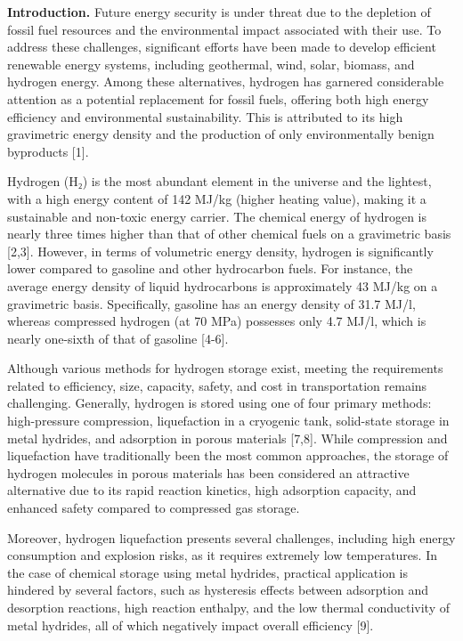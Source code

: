 \begin{multicols}{2}
{\bfseries Introduction.} Future energy security is under threat due to the
depletion of fossil fuel resources and the environmental impact
associated with their use. To address these challenges, significant
efforts have been made to develop efficient renewable energy systems,
including geothermal, wind, solar, biomass, and hydrogen energy. Among
these alternatives, hydrogen has garnered considerable attention as a
potential replacement for fossil fuels, offering both high energy
efficiency and environmental sustainability. This is attributed to its
high gravimetric energy density and the production of only
environmentally benign byproducts {[}1{]}.

Hydrogen (H₂) is the most abundant element in the universe and the
lightest, with a high energy content of 142 MJ/kg (higher heating
value), making it a sustainable and non-toxic energy carrier. The
chemical energy of hydrogen is nearly three times higher than that of
other chemical fuels on a gravimetric basis {[}2,3{]}. However, in terms
of volumetric energy density, hydrogen is significantly lower compared
to gasoline and other hydrocarbon fuels. For instance, the average
energy density of liquid hydrocarbons is approximately 43 MJ/kg on a
gravimetric basis. Specifically, gasoline has an energy density of 31.7
MJ/l, whereas compressed hydrogen (at 70 MPa) possesses only 4.7 MJ/l,
which is nearly one-sixth of that of gasoline {[}4-6{]}.

Although various methods for hydrogen storage exist, meeting the
requirements related to efficiency, size, capacity, safety, and cost in
transportation remains challenging. Generally, hydrogen is stored using
one of four primary methods: high-pressure compression, liquefaction in
a cryogenic tank, solid-state storage in metal hydrides, and adsorption
in porous materials {[}7,8{]}. While compression and liquefaction have
traditionally been the most common approaches, the storage of hydrogen
molecules in porous materials has been considered an attractive
alternative due to its rapid reaction kinetics, high adsorption
capacity, and enhanced safety compared to compressed gas storage.

Moreover, hydrogen liquefaction presents several challenges, including
high energy consumption and explosion risks, as it requires extremely
low temperatures. In the case of chemical storage using metal hydrides,
practical application is hindered by several factors, such as hysteresis
effects between adsorption and desorption reactions, high reaction
enthalpy, and the low thermal conductivity of metal hydrides, all of
which negatively impact overall efficiency {[}9{]}.


\end{multicols}

